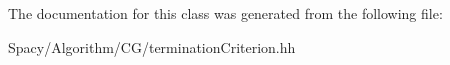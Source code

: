 The documentation for this class was generated from the following file\+:\begin{DoxyCompactItemize}
\item 
Spacy/\+Algorithm/\+C\+G/termination\+Criterion.\+hh\end{DoxyCompactItemize}
